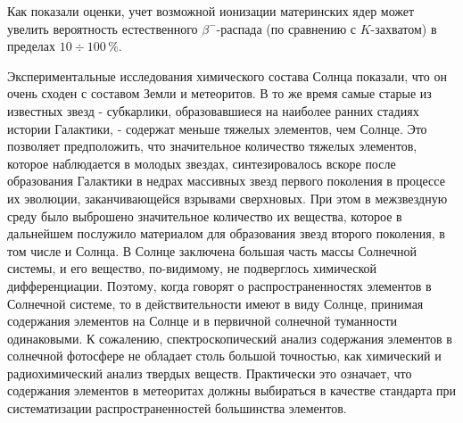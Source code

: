 Как показали оценки, учет возможной ионизации материнских ядер
может увелить вероятность естественного $\beta^-$-распада (по сравнению с
$K$-захватом) в пределах $10\div 100\,\%$.

Экспериментальные исследования химического состава Солнца показали, что
он очень сходен с составом Земли и метеоритов. В то же время самые старые из
известных звезд - субкарлики, образовавшиеся на наиболее  ранних стадиях истории
Галактики, - содержат меньше тяжелых элементов, чем Солнце. Это позволяет
предположить, что значительное количество тяжелых элементов, которое
наблюдается в молодых звездах, синтезировалось вскоре после образования
Галактики в недрах массивных звезд первого поколения в процессе их эволюции,
заканчивающейся взрывами сверхновых. При этом в межзвездную среду было
выброшено значительное количество их вещества, которое в дальнейшем послужило
материалом для образования звезд второго поколения, в том числе и Солнца.
В Солнце заключена большая часть массы Солнечной системы, и его вещество,
по-видимому, не подверглось химической дифференциации. Поэтому, когда говорят
о распространенностях элементов в Солнечной системе, то в действительности имеют
в виду Солнце, принимая содержания элементов на Солнце и в первичной солнечной
туманности одинаковыми. К сожалению, спектроскопический анализ содержания
элементов в солнечной фотосфере не обладает столь большой точностью, как
химический и радиохимический анализ твердых веществ. Практически это означает,
что содержания элементов в метеоритах должны выбираться в качестве стандарта при
систематизации распространенностей большинства элементов.

